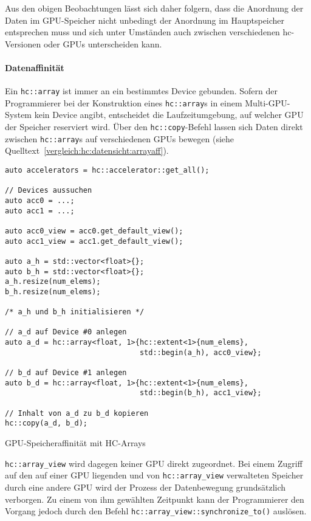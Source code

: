 Aus den obigen Beobachtungen lässt sich daher folgern, dass die Anordnung der
Daten im GPU-Speicher nicht unbedingt der Anordnung im Hauptspeicher entsprechen
muss und sich unter Umständen auch zwischen verschiedenen \gls{hc}-Versionen
oder GPUs unterscheiden kann.

\paragraph{Datenaffinität}

Ein \texttt{hc::array} ist immer an ein bestimmtes Device gebunden. Sofern der
Programmierer bei der Konstruktion eines \texttt{hc::array}s in einem
Multi-GPU-System kein Device angibt, entscheidet die Laufzeitumgebung, auf
welcher GPU der Speicher reserviert wird. Über den \texttt{hc::copy}-Befehl
lassen sich Daten direkt zwischen \texttt{hc::array}s auf verschiedenen GPUs
bewegen (siehe Quelltext~\ref{vergleich:hc:datensicht:arrayaff}).

\begin{code}
    \begin{verbatim}
auto accelerators = hc::accelerator::get_all();

// Devices aussuchen
auto acc0 = ...;
auto acc1 = ...;

auto acc0_view = acc0.get_default_view();
auto acc1_view = acc1.get_default_view();
        
auto a_h = std::vector<float>{};
auto b_h = std::vector<float>{};
a_h.resize(num_elems);
b_h.resize(num_elems);

/* a_h und b_h initialisieren */

// a_d auf Device #0 anlegen
auto a_d = hc::array<float, 1>{hc::extent<1>{num_elems},
                               std::begin(a_h), acc0_view};

// b_d auf Device #1 anlegen
auto b_d = hc::array<float, 1>{hc::extent<1>{num_elems},
                               std::begin(b_h), acc1_view};

// Inhalt von a_d zu b_d kopieren
hc::copy(a_d, b_d);
    \end{verbatim}
    \caption{GPU-Speicheraffinität mit HC-Arrays}
    \label{vergleich:hc:datensicht:arrayaff}
\end{code}


\texttt{hc::array\_view} wird dagegen keiner GPU direkt zugeordnet. Bei einem
Zugriff auf den auf einer GPU liegenden und von \texttt{hc::array\_view}
verwalteten Speicher durch eine andere GPU wird der Prozess der Datenbewegung
grundsätzlich verborgen. Zu einem von ihm gewählten Zeitpunkt kann der
Programmierer den Vorgang jedoch durch den Befehl
\texttt{hc::array\_view::synchronize\_to()} auslösen.

